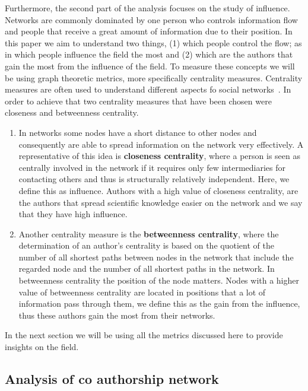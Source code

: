 \documentclass{article}
\theoremstyle{definition}
\begin{document}
Furthermore, the second part of the analysis focuses on the study of influence.
Networks are commonly dominated by one person who controls information flow and
people that receive a great amount of information due to their position.
In this paper we aim to understand two things, (1) which people control the flow;
as in which people influence the field the most and (2) which are the authors that
gain the most from the influence of the field.
To measure these concepts we will be using graph theoretic metrics, more specifically
centrality measures. Centrality measures are often used to understand different
aspects fo social networks~\cite{Landherr2010}. In order to achieve that two
centrality measures that have been chosen were closeness and betweenness
centrality.

\begin{enumerate}
    \item In networks some nodes have a short distance to other nodes and consequently
    are able to spread information on the network very effectively.
    A representative of this idea is \textbf{closeness centrality}, where a person is seen
    as centrally involved in the network if it requires only few intermediaries
    for contacting others and thus is structurally relatively independent. Here,
    we define this as influence. Authors with a high value of closeness centrality,
    are the authors that spread scientific knowledge easier on the network
    and we say that they have high influence.
    \item Another centrality measure is the \textbf{betweenness centrality},
    where the determination of an author's centrality is based on the quotient of
    the number of all shortest paths between nodes in the network that include
    the regarded node and the number of all shortest paths in the network.
    In betweenness centrality the position of the node matters. Nodes
    with a higher value of betweenness centrality are located in positions that
    a lot of information pass through them, we define this as the gain from
    the influence, thus these authors gain the most from their networks.
\end{enumerate}

In the next section we will be using all the metrics discussed here to provide
insights on the field.

\subsection{Analysis of co authorship network}\label{section:results}
\end{document}

